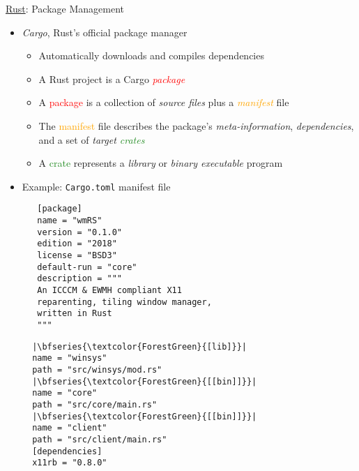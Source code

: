 \begin{frame}[c,fragile]{\underline{Rust}: Package Management \hfill {\footnotesize \currentname}}

    \begin{itemize}

        \item \textit{Cargo}, Rust's official package manager\\
            \begin{itemize}
                \item Automatically downloads and compiles dependencies
                \item A Rust project is a Cargo \textcolor{red}{\textit{package}}
                \item A \textcolor{red}{package} is a collection of \textit{source files} plus a \textcolor{orange}{\textit{manifest}} file
                \item The \textcolor{orange}{manifest} file describes the package's \textit{meta-information}, \textit{dependencies}, and a set of \textit{target \textcolor{ForestGreen}{crates}}
                \item A \textcolor{ForestGreen}{crate} represents a \textit{library} or \textit{binary executable} program
            \end{itemize}

        \item Example: \texttt{Cargo.toml} manifest file\\
\begin{minipage}{.55\linewidth}
\begin{verbatim}
   [package]
   name = "wmRS"
   version = "0.1.0"
   edition = "2018"
   license = "BSD3"
   default-run = "core"
   description = """
   An ICCCM & EWMH compliant X11
   reparenting, tiling window manager,
   written in Rust
   """
\end{verbatim}
\end{minipage}%
\begin{minipage}{.35\linewidth}
\begin{verbatim}
  |\bfseries{\textcolor{ForestGreen}{[lib]}}|
  name = "winsys"
  path = "src/winsys/mod.rs"
  |\bfseries{\textcolor{ForestGreen}{[[bin]]}}|
  name = "core"
  path = "src/core/main.rs"
  |\bfseries{\textcolor{ForestGreen}{[[bin]]}}|
  name = "client"
  path = "src/client/main.rs"
  [dependencies]
  x11rb = "0.8.0"
\end{verbatim}
\end{minipage}

    \end{itemize}

    \vfill

\end{frame}

